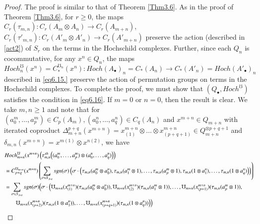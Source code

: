 \documentclass[10pt, colorlinks]{article}
\numberwithin{equation}{section} \DeclareMathSizes{2}{10}{12}{13}
\begin{document}
\begin{proof}
 The proof is similar to that of Theorem \ref{Thm3.6}. As in the proof of Theorem \ref{Thm3.6},  for $r\geq 0$, the maps $C_r(\tau_{m,n}): C_r(A_m  \otimes A_n)\longrightarrow C_r(A_{m+n})$, $C_r(\tau'_{m,n}):C_r(A'_m  \otimes A'_n)\longrightarrow C_r(A'_{m+n})$   preserve the action (described in \eqref{act2}) of $S_r$ on the terms in the Hochschild complexes.  
    Further, since each $Q_n$ is cocommutative, for any $x^n\in Q_n$, the maps 
\begin{equation}
Hoch^\mho_{n}(x^n)=C^{\mho_n}_*(x^n):Hoch(A_\bullet)_n=C_*(A_n)\longrightarrow C_*(A'_n)=Hoch(A'_\bullet)_n
\end{equation} described in \eqref{eq6.15.} preserve the action of permutation groups on terms in the Hochschild complexes.
To complete the proof, we must show that $(Q_\bullet,Hoch^\mho)$ satisfies the condition in \eqref{eq6.16}. If $m=0$ or $n=0$, then the result is clear. We take $m,n\geq 1$ and note that for $(a^m_0,\ldots, a^m_p)\in C_p(A_m),(a^n_0,\ldots, a^n_q)\in C_q(A_n)$ and $x^{m+n}\in Q_{m+n}$ with  iterated coproduct $\Delta^{p+q}_{m+n}(x^{m+n})=x^{m+n}_{(1)}\otimes\ldots \otimes x^{m+n}_{(p+q+1)}\in Q_{m+n}^{\otimes p+q+1}$ and $\delta_{m,n}(x^{m+n})=x^{m(1)}\otimes x^{n(2)}$, we have
   \begin{align}
       &Hoch^{\mho}_{m+n}(x^{m+n})\left(\tau^{sh}_{m,n}\Big((a^m_0,\ldots, a^m_p)\otimes (a^n_0,\ldots, a^n_q)\Big)\right)\notag\\
       &=C_{p+q}^{\mho_{m+n}}(x^{m+n})\left(\sum_{\sigma\in S_{p,q}}sgn(\sigma)\left(\sigma\cdot\left(\tau_{m,n}(a^m_0\otimes a^n_0),\tau_{m,n}(a^m_1\otimes1),\ldots,\tau_{m,n}(a^m_p\otimes 1),\tau_{m,n}(1\otimes a^n_1),\ldots ,\tau_{m,n}(1\otimes a^n_q)\right)\right)\right)\notag\\
       &=\sum_{\sigma\in S_{p,q}}sgn(\sigma)\Big(\sigma\cdot\Big(\mho_{m+n}(x^{m+n}_{(1)})(\tau_{m,n}(a^m_0\otimes a_0^n)),\mho_{m+n}(x^{m+n}_{(2)})(\tau_{m,n}(a^m_1\otimes1)),\ldots,\mho_{m+n}(x^{m+n}_{(p+1)})(\tau_{m,n}(a^m_p\otimes 1)),\notag\\
       &\qquad\mho_{m+n}(x^{m+n}_{(p+2)})(\tau_{m,n}(1\otimes a^n_1)),\ldots ,\mho_{m+n}(x^{m+n}_{(p+q+1)})(\tau_{m,n}(1\otimes a^n_q))\Big)\Big)\notag

\end{align}
\end{proof}
\end{document}
